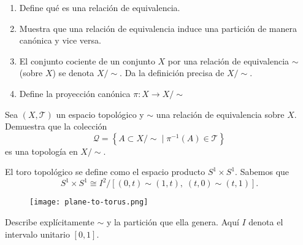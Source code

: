 \documentclass[b5paper,10pt,twoside]{book}
\begin{document}
\begin{problem}\hfill\null
\begin{enumerate}[label=(\roman*)]
\item Define qué es una relación de equivalencia.
\item Muestra que una relación de equivalencia induce una partición de manera canónica y vice versa.
\item El conjunto cociente de un conjunto \(X\) por una relación de equivalencia \(\sim\) (sobre \(X\)) se denota \(X/\!\!\sim\). Da la definición precisa de \(X/\!\!\sim\).
\item Define la proyección canónica \(\pi\colon X\to X/\!\!\sim\)
\end{enumerate}
\end{problem}


\begin{problem}
Sea \((X,\mathcal{T})\) 
un espacio topológico
y \(\sim\) una relación 
de equivalencia sobre
\(X\).
Demuestra 
que la colección
\[
\mathcal{Q} = \left\{ 
    A\subset X/\!\!\sim \;\bigg|\; \pi^{-1}(A)\in  \mathcal{T}
 \right\}
\]
es una topología
en \(X/\!\!\sim\).
\end{problem}

\pagebreak

\begin{problem}
El toro topológico se define como el espacio  producto   \(S^1\times S^1\).
Sabemos que 
\[
S^1\times S^1 \cong I^2 / [(0,t)\sim(1,t),\; (t,0)\sim (t,1)].
\]
\begin{figure}[!htb]
    \centering
    \texttt{[image: plane-to-torus.png]}
\end{figure}


Describe explícitamente \(\sim\) y la partición que ella genera.
Aquí \(I\) denota el 
intervalo unitario \([0,1]\).
\end{problem}
\end{document}
